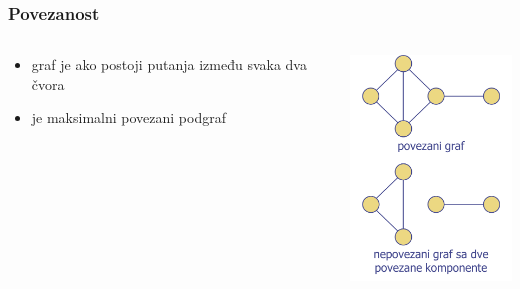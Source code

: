\documentclass[compress,aspectratio=169]{beamer}
\begin{document}
\begin{frame}[fragile]
  \frametitle{Povezanost}
  \begin{columns}
    \begin{column}[t]{6cm}
      \begin{itemize}
        \item graf je  ako postoji putanja između svaka 
          dva čvora
        \item {} je maksimalni povezani podgraf
      \end{itemize}
    \end{column}
    \begin{column}[t]{6cm}
      \begin{center}
        \includegraphics[width=4.5cm]{asp-14-pic15.png}
      \end{center}
    \end{column}
  \end{columns}
\end{frame}
\end{document}
